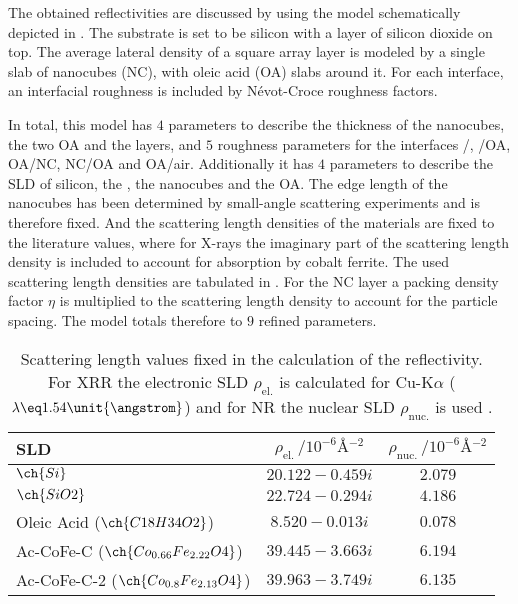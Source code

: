 \documentclass[\main/dresen_thesis.tex]{subfiles}
\begin{document}
    The obtained reflectivities are discussed by using the model schematically depicted in .
    The substrate is set to be silicon with a layer of silicon dioxide on top.
    The average lateral density of a square array layer is modeled by a single slab of nanocubes (NC), with oleic acid (OA) slabs around it.
    For each interface, an interfacial roughness is included by Névot-Croce roughness factors.

    In total, this model has $4$ parameters to describe the thickness of the nanocubes, the two OA and the  layers, and $5$ roughness parameters for the interfaces /, /OA, OA/NC, NC/OA  and OA/air.
    Additionally it has $4$ parameters to describe the SLD of silicon, the , the nanocubes and the OA.
    The edge length of the nanocubes has been determined by small-angle scattering experiments and is therefore fixed.
    And the scattering length densities of the materials are fixed to the literature values, where for X-rays the imaginary part of the scattering length density is included to account for absorption by cobalt ferrite.
    The used scattering length densities are tabulated in .
    For the NC layer a packing density factor $\eta$ is multiplied to the scattering length density to account for the particle spacing.
    The model totals therefore to $9$ refined parameters.

    \begin{table}[ht]
      \centering
      \caption{\label{tab:monolayers:charMethod:reflectometryScatteringLenghts}Scattering length values fixed in the calculation of the reflectivity. For XRR the electronic SLD $\rho_\mathrm{el.}$ is calculated for Cu-K$\alpha$ ($\lambda \eq 1.54 \unit{\angstrom}$) and for NR the nuclear SLD $\rho_\mathrm{nuc.}$ is used \cite{Sears_1992_Neutr, BerkeleyLab_1993_asf}.}
      \begin{tabular}{ l | c | c }
        \textbf{SLD}  & $\rho_\mathrm{el.} \, / \unit{10^{-6} \angstrom^{-2}}$ & $\rho_\mathrm{nuc.} \, / \unit{10^{-6} \angstrom^{-2}}$ \\
        \hline
        $\ch{Si}$                                 & $20.122 - 0.459 i$   & $2.079$  \\
        $\ch{SiO2}$                               & $22.724 - 0.294 i$   & $4.186$  \\
        Oleic Acid ($\ch{C18H34O2}$)              & $8.520  - 0.013 i$   & $0.078$  \\
        Ac-CoFe-C ($\ch{Co_{0.66}Fe_{2.22}O4}$)   & $39.445 - 3.663 i$   & $6.194$  \\
        Ac-CoFe-C-2 ($\ch{Co_{0.8} Fe_{2.13}O4}$) & $39.963 - 3.749 i$   & $6.135$  \\
        \hline
      \end{tabular}
    \end{table}
\end{document}
